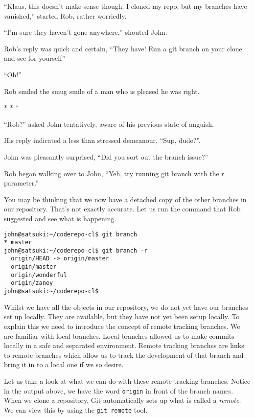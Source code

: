 \begin{trenches}
``Klaus, this doesn't make sense though.  I cloned my repo, but my branches have vanished,'' started Rob, rather worriedly.

``I'm sure they haven't gone anywhere,'' shouted John.  

Rob's reply was quick and certain, ``They have!  Run a git branch on your clone and see for yourself''

``Oh!''

Rob smiled the smug smile of a man who is pleased he was right.

\begin{center} * * * \end{center}

``Rob?'' asked John tentatively, aware of his previous state of anguish.

His reply indicated a less than stressed demeanour, ``Sup, dude?''.

John was pleasantly surprised, ``Did you sort out the branch issue?''

Rob began walking over to John, ``Yeh, try running git branch with the r parameter.''

\end{trenches}

You may be thinking that we now have a detached copy of the other branches in our repository.  That's not exactly accurate.  Let us run the command that Rob suggested and see what is happening.  

\begin{Verbatim}[frame=leftline,framerule=1mm,fontsize=\relsize{-3}] 
john@satsuki:~/coderepo-cl$ git branch
* master
john@satsuki:~/coderepo-cl$ git branch -r
  origin/HEAD -> origin/master
  origin/master
  origin/wonderful
  origin/zaney
john@satsuki:~/coderepo-cl$ 
\end{Verbatim}

Whilst we have all the objects in our repository, we do not yet have our branches set up locally.  They are available, but they have not yet been setup locally.  To explain this we need to introduce the concept of remote tracking branches.  We are familiar with local branches.  Local branches allowed us to make commits locally in a safe and separated environment.  Remote tracking branches are links to remote branches which allow us to track the development of that branch and bring it in to a local one if we so desire.

Let us take a look at what we can do with these remote tracking branches.  Notice in the output above, we have the word \texttt{origin} in front of the branch names.  When we clone a repository, Git automatically sets up what is called a \emph{remote}.  We can view this by using the \texttt{git remote} tool.

